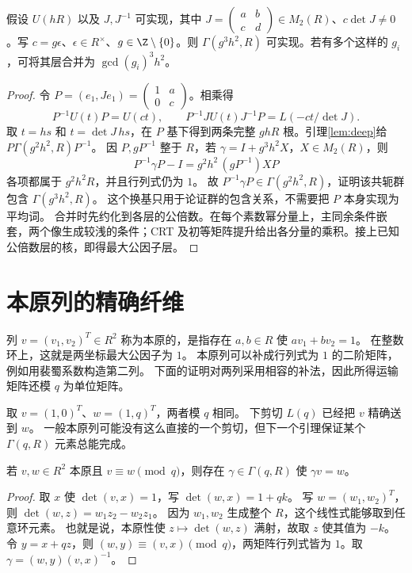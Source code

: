 \begin{lemma}[横向返回与换基的分母损失]\label{lem:transverse}
假设 $U(hR)$ 以及 $J,J^{-1}$ 可实现，其中 $J=\left(\begin{smallmatrix}a&b\\c&d\end{smallmatrix}\right)\in M_2(R)$、$c\det J\ne0$。写 $c=g\epsilon$、$\epsilon\in R^\times$、$g\in\Z\setminus\{0\}$。则 $\Gamma(g^3h^2,R)$ 可实现。若有多个这样的 $g_i$，可将其层合并为 $\gcd(g_i)^3h^2$。
\end{lemma}
\begin{proof}
令 $P=(e_1,Je_1)=\left(\begin{smallmatrix}1&a\\0&c\end{smallmatrix}\right)$。相乘得
\[
P^{-1}U(t)P=U(ct),\qquad
P^{-1}JU(t)J^{-1}P=L(-ct/\det J).
\]
取 $t=hs$ 和 $t=\det J\,hs$，在 $P$ 基下得到两条完整 $ghR$ 根。引理\ref{lem:deep}给 $P\Gamma(g^2h^2,R)P^{-1}$。
因 $P,gP^{-1}$ 整于 $R$，若 $\gamma=I+g^3h^2X$，$X\in M_2(R)$，则
\[
P^{-1}\gamma P-I
=g^2h^2\,(gP^{-1})XP
\]
各项都属于 $g^2h^2R$，并且行列式仍为 $1$。
故 $P^{-1}\gamma P\in\Gamma(g^2h^2,R)$，证明该共轭群包含 $\Gamma(g^3h^2,R)$。
这个换基只用于论证群的包含关系，不需要把 $P$ 本身实现为平均词。
合并时先约化到各层的公倍数。在每个素数幂分量上，主同余条件嵌套，两个像生成较浅的条件；CRT 及初等矩阵提升给出各分量的乘积。接上已知公倍数层的核，即得最大公因子层。
\end{proof}


\section{本原列的精确纤维}
列 $v=(v_1,v_2)^T\in R^2$ 称为本原的，是指存在 $a,b\in R$ 使 $av_1+bv_2=1$。
在整数环上，这就是两坐标最大公因子为 $1$。
本原列可以补成行列式为 $1$ 的二阶矩阵，例如用裴蜀系数构造第二列。
下面的证明对两列采用相容的补法，因此所得运输矩阵还模 $q$ 为单位矩阵。

\begin{example}
取 $v=(1,0)^T$、$w=(1,q)^T$，两者模 $q$ 相同。
下剪切 $L(q)$ 已经把 $v$ 精确送到 $w$。
一般本原列可能没有这么直接的一个剪切，但下一个引理保证某个 $\Gamma(q,R)$ 元素总能完成。
\end{example}

\begin{lemma}[相同剩余类中的精确输送]\label{lem:fiber}
若 $v,w\in R^2$ 本原且 $v\equiv w\pmod q$，则存在 $\gamma\in\Gamma(q,R)$ 使 $\gamma v=w$。
\end{lemma}
\begin{proof}
取 $x$ 使 $\det(v,x)=1$，写 $\det(w,x)=1+qk$。
写 $w=(w_1,w_2)^T$，则 $\det(w,z)=w_1z_2-w_2z_1$。
因为 $w_1,w_2$ 生成整个 $R$，这个线性式能够取到任意环元素。
也就是说，本原性使 $z\mapsto\det(w,z)$ 满射，故取 $z$ 使其值为 $-k$。令 $y=x+qz$，则 $(w,y)\equiv(v,x)\pmod q$，两矩阵行列式皆为 $1$。取 $\gamma=(w,y)(v,x)^{-1}$。
\end{proof}


